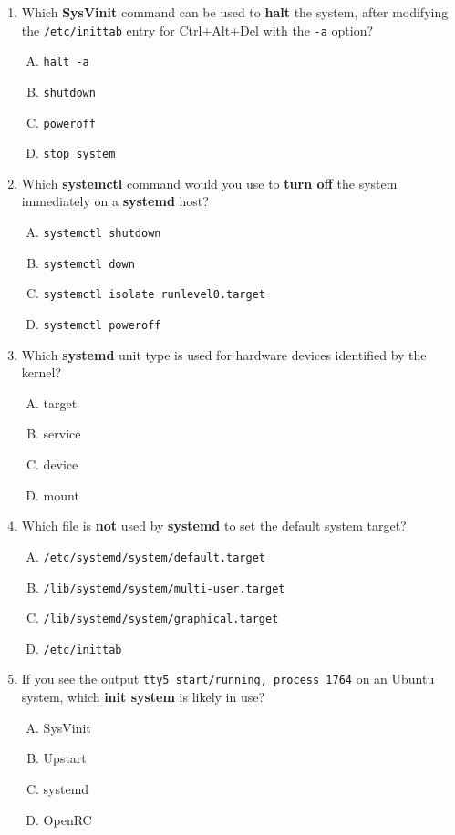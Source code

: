 \documentclass[a4paper]{report}
\begin{document}
\begin{enumerate}[1.]
    \item Which \textbf{SysVinit} command can be used to \textbf{halt} the system, after modifying the \texttt{/etc/inittab} entry for Ctrl+Alt+Del with the \texttt{-a} option?
    \begin{enumerate}[A)]
        \item \texttt{halt -a}
        \item \texttt{shutdown}
        \item \texttt{poweroff}
        \item \texttt{stop system}
    \end{enumerate}
    
    \item Which \textbf{systemctl} command would you use to \textbf{turn off} the system immediately on a \textbf{systemd} host?
    \begin{enumerate}[A)]
        \item \texttt{systemctl shutdown}
        \item \texttt{systemctl down}
        \item \texttt{systemctl isolate runlevel0.target}
        \item \texttt{systemctl poweroff}
    \end{enumerate}
    
    \item Which \textbf{systemd} unit type is used for hardware devices identified by the kernel?
    \begin{enumerate}[A)]
        \item target
        \item service
        \item device
        \item mount
    \end{enumerate}
    
    \item Which file is \textbf{not} used by \textbf{systemd} to set the default system target?
    \begin{enumerate}[A)]
        \item \texttt{/etc/systemd/system/default.target}
        \item \texttt{/lib/systemd/system/multi-user.target}
        \item \texttt{/lib/systemd/system/graphical.target}
        \item \texttt{/etc/inittab}
    \end{enumerate}
    
    \item If you see the output \texttt{tty5 start/running, process 1764} on an Ubuntu system, which \textbf{init system} is likely in use?
    \begin{enumerate}[A)]
        \item SysVinit
        \item Upstart
        \item systemd
        \item OpenRC
    \end{enumerate}
    

\end{enumerate}
\end{document}
